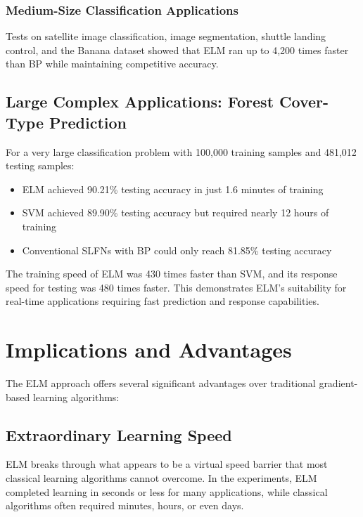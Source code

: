 \documentclass[11pt]{article}
\begin{document}
\subsubsection{Medium-Size Classification Applications}

Tests on satellite image classification, image segmentation, shuttle landing control, and the Banana dataset showed that ELM ran up to 4,200 times faster than BP while maintaining competitive accuracy.

\subsection{Large Complex Applications: Forest Cover-Type Prediction}

For a very large classification problem with 100,000 training samples and 481,012 testing samples:
\begin{itemize}
    \item ELM achieved 90.21\% testing accuracy in just 1.6 minutes of training
    \item SVM achieved 89.90\% testing accuracy but required nearly 12 hours of training
    \item Conventional SLFNs with BP could only reach 81.85\% testing accuracy
\end{itemize}

The training speed of ELM was 430 times faster than SVM, and its response speed for testing was 480 times faster. This demonstrates ELM's suitability for real-time applications requiring fast prediction and response capabilities.

\section{Implications and Advantages}

The ELM approach offers several significant advantages over traditional gradient-based learning algorithms:

\subsection{Extraordinary Learning Speed}

ELM breaks through what appears to be a virtual speed barrier that most classical learning algorithms cannot overcome. In the experiments, ELM completed learning in seconds or less for many applications, while classical algorithms often required minutes, hours, or even days.
\end{document}
